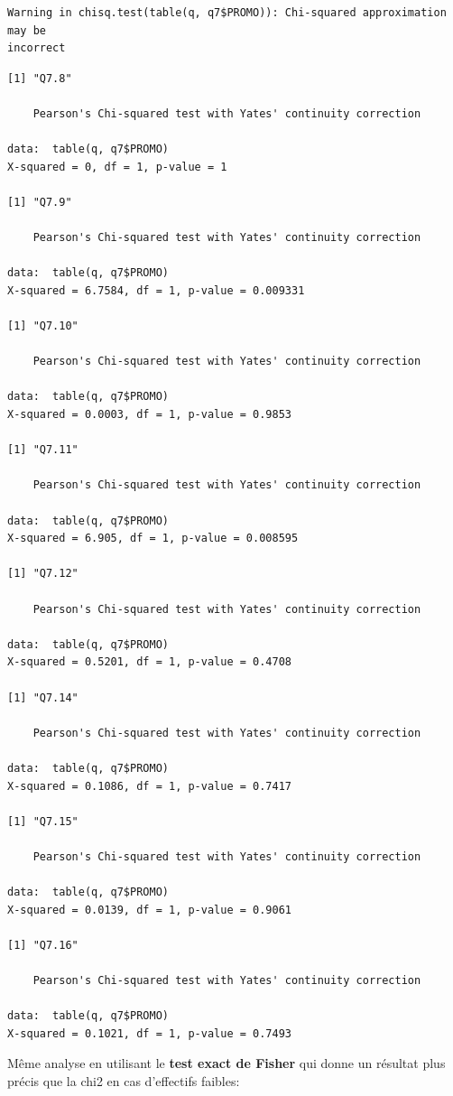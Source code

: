\documentclass[]{article}
\begin{document}
\begin{verbatim}
Warning in chisq.test(table(q, q7$PROMO)): Chi-squared approximation may be
incorrect
\end{verbatim}

\begin{verbatim}
[1] "Q7.8"

    Pearson's Chi-squared test with Yates' continuity correction

data:  table(q, q7$PROMO)
X-squared = 0, df = 1, p-value = 1

[1] "Q7.9"

    Pearson's Chi-squared test with Yates' continuity correction

data:  table(q, q7$PROMO)
X-squared = 6.7584, df = 1, p-value = 0.009331

[1] "Q7.10"

    Pearson's Chi-squared test with Yates' continuity correction

data:  table(q, q7$PROMO)
X-squared = 0.0003, df = 1, p-value = 0.9853

[1] "Q7.11"

    Pearson's Chi-squared test with Yates' continuity correction

data:  table(q, q7$PROMO)
X-squared = 6.905, df = 1, p-value = 0.008595

[1] "Q7.12"

    Pearson's Chi-squared test with Yates' continuity correction

data:  table(q, q7$PROMO)
X-squared = 0.5201, df = 1, p-value = 0.4708

[1] "Q7.14"

    Pearson's Chi-squared test with Yates' continuity correction

data:  table(q, q7$PROMO)
X-squared = 0.1086, df = 1, p-value = 0.7417

[1] "Q7.15"

    Pearson's Chi-squared test with Yates' continuity correction

data:  table(q, q7$PROMO)
X-squared = 0.0139, df = 1, p-value = 0.9061

[1] "Q7.16"

    Pearson's Chi-squared test with Yates' continuity correction

data:  table(q, q7$PROMO)
X-squared = 0.1021, df = 1, p-value = 0.7493
\end{verbatim}

Même analyse en utilisant le \textbf{test exact de Fisher} qui donne un
résultat plus précis que la chi2 en cas d'effectifs faibles:
\end{document}
